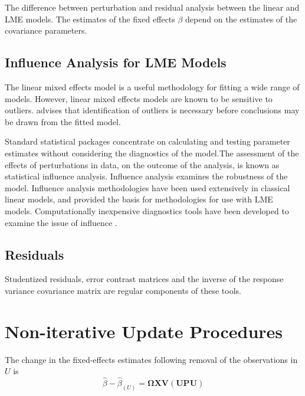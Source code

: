 \documentclass[12pt, a4paper]{report}
\theoremstyle{plain}
\theoremstyle{definition}
\theoremstyle{remark}
\begin{document}
The difference between perturbation and residual analysis between the linear and LME models.
The estimates of the fixed effects $\beta$ depend on the estimates of the covariance parameters.




\subsection{Influence Analysis for LME Models} %
The linear mixed effects model is a useful methodology for fitting a wide range of models. However, linear mixed effects models are known to be sensitive to outliers. \citet{CPJ} advises that identification of outliers is necessary before conclusions may be drawn from the fitted model.

Standard statistical packages concentrate on calculating and testing parameter estimates without considering the diagnostics of the model.The assessment of the effects of perturbations in data, on the outcome of the analysis, is known as statistical influence analysis. Influence analysis examines the robustness of the model. Influence analysis methodologies have been used extensively in classical linear models, and provided the basis for methodologies for use with LME models.
Computationally inexpensive diagnostics tools have been developed to examine the issue of influence \citep{Zewotir}.

\subsection*{Residuals}
Studentized residuals, error contrast matrices and the inverse of the response variance covariance matrix are regular components of these tools.






\section{Non-iterative Update Procedures}


The change in the fixed-effects estimates following removal of the observations in $U$ is
\[ \hat{\beta} - \hat{\beta}_{(U)} = \boldsymbol{\Omega}\boldsymbol{X}\boldsymbol{V}
\left( \boldsymbol{U} \boldsymbol{P}\boldsymbol{U}\right)   \]
\end{document}
